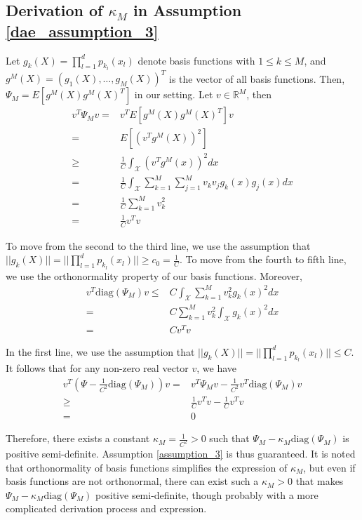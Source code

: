    \subsection{Derivation of $\kappa_M$ in Assumption \ref{dae_assumption_3}}\label{derivation_kappa}
        Let $g_k(X)=\prod_{l=1}^d p_{k_l}(x_l)$ denote basis functions with $1 \le k \le M$, and $g^M(X)=(g_1(X), \ldots, g_M(X))^T$ is the vector of all basis functions. Then, $\Psi_M=E[g^M(X)g^M(X)^{T}]$ in our setting. Let $v \in \mathbb{R}^M$, then
        \begin{align*}
            v^{T}\Psi_M v =& v^{T} E[g^M(X)g^M(X)^{T}]v\\
            =& E[(v^{T}g^M(X))^2]\\
            \ge & \frac{1}{C} \int_{\mathcal{X}}(v^{T}g^M(x))^2 dx\\
            = & \frac{1}{C} \int_{\mathcal{X}} \sum_{k=1}^{M}\sum_{j=1}^{M}v_kv_jg_k(x)g_j(x) dx\\
            = & \frac{1}{C}\sum_{k=1}^{M}v_k^2\\
            = & \frac{1}{C}v^{T}v
        \end{align*}

        To move from the second to the third line, we use the assumption that $||g_k(X)||=||\prod_{l=1}^d p_{k_l}(x_l)|| \ge c_0 = \frac{1}{C}$. To move from the fourth to fifth line, we use the orthonormality property of our basis functions. Moreover, 
        \begin{align*}
            v^{T}\mathrm{diag}(\Psi_M)v \le & C \int_{\mathcal{X}}\sum_{k=1}^M v_k^2 g_k(x)^2 dx\\
            =& C \sum_{k=1}^M v_k^2 \int_{\mathcal{X}} g_k(x)^2 dx\\
            =& Cv^{T}v
        \end{align*}

        In the first line, we use the assumption that $||g_k(X)||=||\prod_{l=1}^d p_{k_l}(x_l)|| \le C$. It follows that for any non-zero real vector $v$, we have
            \begin{align*}
                v^{T}\left(\Psi-\frac{1}{C^2}\mathrm{diag}(\Psi_M)\right)v=&v^{T}\Psi_Mv-\frac{1}{C^2}v^{T}\mathrm{diag}(\Psi_M)v\\
                \ge & \frac{1}{C}v^{T}v-\frac{1}{C}v^{T}v\\
                =&0
            \end{align*}
                        
        Therefore, there exists a constant $\kappa_M=\frac{1}{C^2}>0$ such that $\Psi_M-\kappa_M\mathrm{diag}(\Psi_M)$ is positive semi-definite. Assumption \ref{assumption_3} is thus guaranteed. It is noted that orthonormality of basis functions simplifies the expression of $\kappa_M$, but even if basis functions are not orthonormal, there can exist such a $\kappa_M>0$ that makes $\Psi_M-\kappa_M\mathrm{diag}(\Psi_M)$ positive semi-definite, though probably with a more complicated derivation process and expression.

